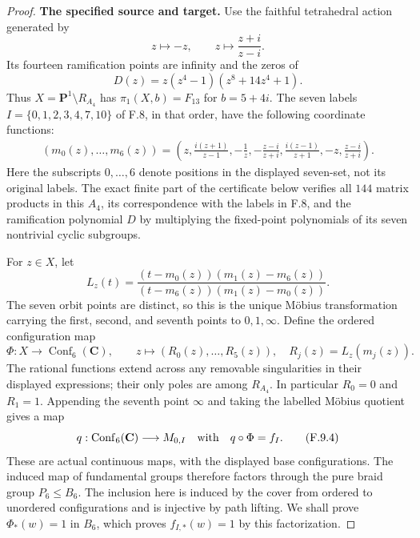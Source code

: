 \begin{proof}
\textbf{The specified source and target.}
Use the faithful tetrahedral action generated by
\[
 z\longmapsto-z,\qquad z\longmapsto\frac{z+i}{z-i}.
\]
Its fourteen ramification points are infinity and the
zeros of
\[
 D(z)=z(z^4-1)(z^8+14z^4+1).
\]
Thus $X=\mathbf P^1\setminus R_{A_4}$ has
$\pi_1(X,b)=F_{13}$ for $b=5+4i$.
The seven labels $I=\{0,1,2,3,4,7,10\}$ of F.8,
in that order, have the following coordinate functions:
\[
 \begin{split}
 (m_0(z),\ldots,m_6(z))=
 \left(z,\frac{i(z+1)}{z-1},-\frac1z,
 -\frac{z-i}{z+i},\frac{i(z-1)}{z+1},-z,
 \frac{z-i}{z+i}\right).
 \end{split}                                                   \tag{F.9.2}
\]
Here the subscripts $0,\ldots,6$ denote positions in
the displayed seven-set, not its original labels.
The exact finite part of the certificate below verifies
all $144$ matrix products in this $A_4$, its correspondence
with the labels in F.8, and the ramification polynomial
$D$ by multiplying the fixed-point polynomials of its
seven nontrivial cyclic subgroups.

For $z\in X$, let
\[
 L_z(t)=\frac{(t-m_0(z))(m_1(z)-m_6(z))}
              {(t-m_6(z))(m_1(z)-m_0(z))}.
\]
The seven orbit points are distinct, so this is the
unique M\"obius transformation carrying the first,
second, and seventh points to $0,1,\infty$.
Define the ordered configuration map
\[
 \Phi:X\longrightarrow\operatorname{Conf}_6(\mathbf C),
 \qquad z\longmapsto(R_0(z),\ldots,R_5(z)),
 \quad R_j(z)=L_z(m_j(z)).                              \tag{F.9.3}
\]
The rational functions extend across any removable
singularities in their displayed expressions; their
only poles are among $R_{A_4}$.  In particular
$R_0=0$ and $R_1=1$.
Appending the seventh point $\infty$ and taking the
labelled M\"obius quotient gives a map
\[
 q:\operatorname{Conf}_6(\mathbf C)\longrightarrow M_{0,I}
 \quad\hbox{with}\quad q\circ\Phi=f_I.                 \tag{F.9.4}
\]
These are actual continuous maps, with the displayed
base configurations.  The induced map of fundamental
groups therefore factors through the pure braid group
$P_6\le B_6$.  The inclusion here is induced by the
cover from ordered to unordered configurations and is
injective by path lifting.  We shall prove
$\Phi_*(w)=1$ in $B_6$, which proves $f_{I,*}(w)=1$
by this factorization.


\end{proof}
